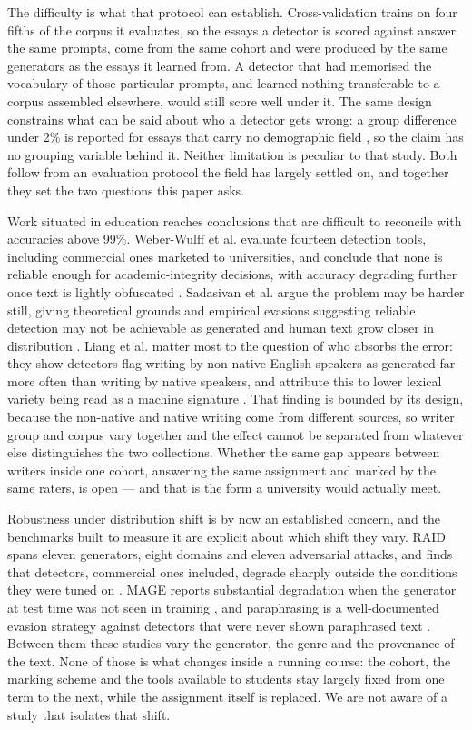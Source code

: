 \documentclass[11pt,a4paper]{article}
\begin{document}
The difficulty is what that protocol can establish. Cross-validation
trains on four fifths of the corpus it evaluates, so the essays a detector
is scored against answer the same prompts, come from the same cohort and
were produced by the same generators as the essays it learned from. A
detector that had memorised the vocabulary of those particular prompts,
and learned nothing transferable to a corpus assembled elsewhere, would
still score well under it. The same design constrains what can be said
about who a detector gets wrong: a group difference under 2\% is reported
for essays that carry no demographic field \cite{qorich2025}, so the claim
has no grouping variable behind it. Neither limitation is peculiar to that
study. Both follow from an evaluation protocol the field has largely
settled on, and together they set the two questions this paper asks.

Work situated in education reaches conclusions that are difficult to
reconcile with accuracies above 99\%. Weber-Wulff et al. evaluate fourteen
detection tools, including commercial ones marketed to universities, and
conclude that none is reliable enough for academic-integrity decisions,
with accuracy degrading further once text is lightly obfuscated
\cite{weberwulff2023}. Sadasivan et al. argue the problem may be harder
still, giving theoretical grounds and empirical evasions suggesting
reliable detection may not be achievable as generated and human text grow
closer in distribution \cite{sadasivan2023}. Liang et al. matter most to
the question of who absorbs the error: they show detectors flag writing by
non-native English speakers as generated far more often than writing by
native speakers, and attribute this to lower lexical variety being read as
a machine signature \cite{liang2023}. That finding is bounded by its
design, because the non-native and native writing come from different
sources, so writer group and corpus vary together and the effect cannot be
separated from whatever else distinguishes the two collections. Whether
the same gap appears between writers inside one cohort, answering the same
assignment and marked by the same raters, is open --- and that is the form
a university would actually meet.

Robustness under distribution shift is by now an established concern, and
the benchmarks built to measure it are explicit about which shift they
vary. RAID spans eleven generators, eight domains and eleven adversarial
attacks, and finds that detectors, commercial ones included, degrade
sharply outside the conditions they were tuned on \cite{raid2024}. MAGE
reports substantial degradation when the generator at test time was not
seen in training \cite{mage2024}, and paraphrasing is a well-documented
evasion strategy against detectors that were never shown paraphrased text
\cite{krishna2023}. Between them these studies vary the generator, the
genre and the provenance of the text. None of those is what changes inside
a running course: the cohort, the marking scheme and the tools available
to students stay largely fixed from one term to the next, while the
assignment itself is replaced. We are not aware of a study that isolates
that shift.
\end{document}
